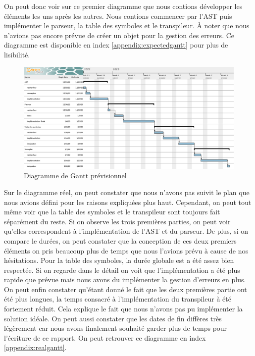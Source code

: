 \documentclass[a4paper]{article}%
\begin{document}
On peut donc voir sur ce premier diagramme que nous contions développer les
éléments les uns après les autres. Nous contions commencer par l'AST puis
implémenter le parseur, la table des symboles et le transpileur. À noter que
nous n'avions pas encore prévue de créer un objet pour la gestion des erreurs.
Ce diagramme est disponible en index \ref{appendix:expectedgantt} pour plus de
lisibilité.

\begin{figure}[h!]
  \begin{center}
  \includegraphics[scale=0.35]{./img/expected-gantt.png}
  \caption{Diagramme de Gantt prévisionnel}
  \end{center}
\end{figure}

Sur le diagramme réel, on peut constater que nous n'avons pas suivit le plan que
nous avions défini pour les raisons expliquées plus haut. Cependant, on peut
tout même voir que la table des symboles et le transpileur sont toujours fait
séparément du reste. Si on observe les trois premières parties, on peut voir
qu'elles correspondent à l'implémentation de l'AST et du parseur. De plus, si on
compare le durées, on peut constater que la conception de ces deux premiers
éléments on pris beaucoup plus de temps que nous l'avions prévu à cause de nos
hésitations. Pour la table des symboles, la durée globale est a été assez bien
respectée. Si on regarde dans le détail on voit que l'implémentation a été plus
rapide que prévue mais nous avons du implémenter la gestion d'erreurs en plus.
On peut enfin constater qu'étant donné le fait que les deux premières partie ont
été plus longues, la temps consacré à l'implémentation du transpileur à été
fortement réduit. Cela explique le fait que nous n'avons pas pu implémenter la
solution idéale. On peut aussi constater que les dates de fin diffères très
légèrement car nous avons finalement souhaité garder plus de temps pour
l'écriture de ce rapport. On peut retrouver ce diagramme en index
\ref{appendix:realgantt}.
\end{document}
